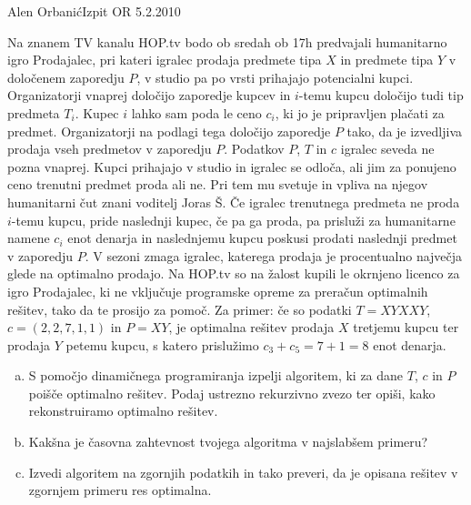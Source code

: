 \begin{naloga}{Alen Orbanić}{Izpit OR 5.2.2010}
\begin{vprasanje}
Na znanem TV kanalu HOP.tv bodo ob sredah ob 17h
predvajali humanitarno igro Prodajalec\texttrademark,
pri kateri igralec prodaja predmete tipa $X$ in predmete tipa $Y$
v določenem zaporedju $P$,
v studio pa po vrsti prihajajo potencialni kupci.
Organizatorji vnaprej določijo zaporedje kupcev
in $i$-temu kupcu določijo tudi tip predmeta $T_i$.
Kupec $i$ lahko sam poda le ceno $c_i$,
ki jo je pripravljen plačati za predmet.
Organizatorji na podlagi tega določijo zaporedje $P$ tako,
da je izvedljiva prodaja vseh predmetov v zaporedju $P$.
Podatkov $P$, $T$ in $c$ igralec seveda ne pozna vnaprej.
Kupci prihajajo v studio in igralec se odloča,
ali jim za ponujeno ceno trenutni predmet proda ali ne.
Pri tem mu svetuje in vpliva na njegov humanitarni čut
znani voditelj Joras Š.
Če igralec trenutnega predmeta ne proda $i$-temu kupcu,
pride naslednji kupec, če pa ga proda,
pa prisluži za humanitarne namene $c_i$ enot denarja
in naslednjemu kupcu poskusi prodati naslednji predmet v zaporedju $P$.
V sezoni zmaga igralec,
katerega prodaja je procentualno največja glede na optimalno prodajo.
Na HOP.tv so na žalost kupili
le okrnjeno licenco za igro Prodajalec\texttrademark,
ki ne vključuje programske opreme za preračun optimalnih rešitev,
tako da te prosijo za pomoč.
Za primer: če so podatki $T = XYXXY$, $c = (2, 2, 7, 1, 1)$ in $P = XY$,
je optimalna rešitev prodaja $X$ tretjemu kupcu ter prodaja $Y$ petemu kupcu,
s katero prislužimo $c_3 + c_5 = 7 + 1 = 8$ enot denarja.

\begin{enumerate}[(a)]
\item S pomočjo dinamičnega programiranja izpelji algoritem,
ki za dane $T$, $c$ in $P$ poišče optimalno rešitev.
Podaj ustrezno rekurzivno zvezo ter opiši,
kako rekonstruiramo optimalno rešitev.

\item Kakšna je časovna zahtevnost tvojega algoritma v najslabšem primeru?

\item Izvedi algoritem na zgornjih podatkih in tako preveri,
da je opisana rešitev v zgornjem primeru res optimalna.
\end{enumerate}
\end{vprasanje}


\end{naloga}
